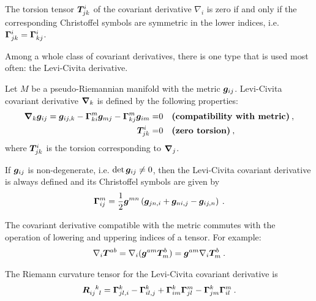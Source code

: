 \begin{proposition}
    The torsion tensor $\boldsymbol{T}^i_{jk}$ of the covariant derivative $\nabla_i$ is zero if and only if the corresponding Christoffel symbols are symmetric in the lower indices, i.e. $\boldsymbol{\Gamma}^i_{jk} = \boldsymbol{\Gamma}^i_{kj}$.
\end{proposition}

Among a whole class of covariant derivatives, there is one type that is used most often: the Levi-Civita derivative.

\begin{definition}
    Let $M$ be a pseudo-Riemannian manifold with the metric $\boldsymbol{g}_{ij}$. Levi-Civita covariant derivative $\boldsymbol{\nabla}_k$ is defined by the following properties:
    \begin{align}
        \boldsymbol{\nabla}_k \boldsymbol{g}_{ij} = \boldsymbol{g}_{ij,k} - \boldsymbol{\Gamma}^m_{ki} \boldsymbol{g}_{mj} - \boldsymbol{\Gamma}^m_{kj} \boldsymbol{g}_{im}  =& 0 \quad \textbf{(compatibility with metric)} \:, \\
        \boldsymbol{T}^{i}_{jk} =& 0 \quad \textbf{(zero torsion)} \:,
    \end{align}
    where $\boldsymbol{T}^i_{jk}$ is the torsion corresponding to $\boldsymbol{\nabla}_j$.
\end{definition}

If $\boldsymbol{g}_{ij}$ is non-degenerate, i.e. $\det \boldsymbol{g}_{ij} \neq 0$, then the Levi-Civita covariant derivative is always defined and its Christoffel symbols are given by
\begin{align}
    \boldsymbol{\Gamma}^m_{ij} =\frac{1}{2} \boldsymbol{g}^{mn} \left( \boldsymbol{g}_{jn,i} + \boldsymbol{g}_{ni,j} - \boldsymbol{g}_{ij,n} \right) \:.
\end{align}

The covariant derivative compatible with the metric commutes with the operation of lowering and uppering indices of a tensor. For example:
\begin{align}
    \nabla_i \boldsymbol{T}^{ab} = \nabla_i (\boldsymbol{g}^{am} \boldsymbol{T}^b_m) = \boldsymbol{g}^{am} \nabla_i \boldsymbol{T}^b_m \:.
\end{align}

The Riemann curvature tensor for the Levi-Civita covariant derivative is
\begin{align}
    \vc R\indices{_i_j^k_l} = \vc \Gamma^k_{jl,i} - \vc \Gamma^k_{il,j} + \vc \Gamma^k_{im} \vc \Gamma^m_{jl} - \vc \Gamma^k_{jm} \vc \Gamma^m_{il} \:.
\end{align}
